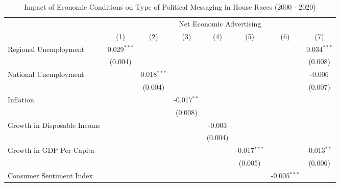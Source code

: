
\begin{table}[htbp]
   \caption{Impact of Economic Conditions on Type of Political Messaging in House Races (2000 - 2020)}
   \bigskip
   \centering
   \small
   \begin{tabular}{lccccccc}
      \toprule
       & \multicolumn{7}{c}{Net Economic Advertising}\\
                                     & (1)           & (2)           & (3)           & (4)           & (5)            & (6)            & (7)\\  
      \midrule 
      Regional Unemployment          & 0.029$^{***}$ &               &               &               &                &                & 0.034$^{***}$\\   
                                     & (0.004)       &               &               &               &                &                & (0.008)\\   
      National Unemployment          &               & 0.018$^{***}$ &               &               &                &                & -0.006\\   
                                     &               & (0.004)       &               &               &                &                & (0.007)\\   
      Inflation                      &               &               & -0.017$^{**}$ &               &                &                &   \\   
                                     &               &               & (0.008)       &               &                &                &   \\   
      Growth in Disposable Income    &               &               &               & -0.003        &                &                &   \\   
                                     &               &               &               & (0.004)       &                &                &   \\   
      Growth in GDP Per Capita       &               &               &               &               & -0.017$^{***}$ &                & -0.013$^{**}$\\   
                                     &               &               &               &               & (0.005)        &                & (0.006)\\   
      Consumer Sentiment Index       &               &               &               &               &                & -0.005$^{***}$ &   \\   

\end{tabular}
\end{table}
